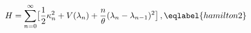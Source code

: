 \begin{equation}
H = \sum_{n=0}^{\infty} \bigl[ {\frac12} \kappa_n^2
+ V(\lambda_n)
+ \frac n\theta (\lambda_n-\lambda_{n-1})^2
\bigr] \,,
\eqlabel{hamilton2}
\end{equation}

